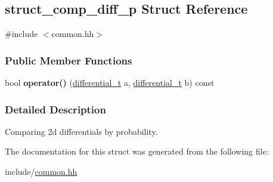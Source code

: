 \hypertarget{structstruct__comp__diff__p}{\subsection{struct\-\_\-comp\-\_\-diff\-\_\-p \-Struct \-Reference}
\label{structstruct__comp__diff__p}
}


{\ttfamily \#include $<$common.\-hh$>$}

\subsubsection*{\-Public \-Member \-Functions}
\begin{DoxyCompactItemize}
\item 
\hypertarget{structstruct__comp__diff__p_a9a261edf5a7a6c20529d39d4c4333a59}{bool {\bfseries operator()} (\hyperlink{structdifferential__t}{differential\-\_\-t} a, \hyperlink{structdifferential__t}{differential\-\_\-t} b) const }\label{structstruct__comp__diff__p_a9a261edf5a7a6c20529d39d4c4333a59}

\end{DoxyCompactItemize}


\subsubsection{\-Detailed \-Description}
\-Comparing 2d differentials by probability. 

\-The documentation for this struct was generated from the following file\-:\begin{DoxyCompactItemize}
\item 
include/\hyperlink{common_8hh}{common.\-hh}\end{DoxyCompactItemize}
